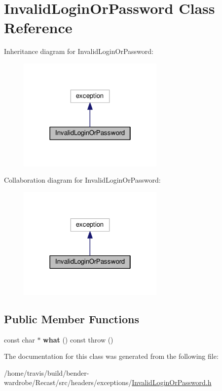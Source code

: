 \hypertarget{class_invalid_login_or_password}{\section{Invalid\-Login\-Or\-Password Class Reference}
\label{class_invalid_login_or_password}
}


Inheritance diagram for Invalid\-Login\-Or\-Password\-:
\nopagebreak
\begin{figure}[H]
\begin{center}
\leavevmode
\includegraphics[width=202pt]{class_invalid_login_or_password__inherit__graph}
\end{center}
\end{figure}


Collaboration diagram for Invalid\-Login\-Or\-Password\-:
\nopagebreak
\begin{figure}[H]
\begin{center}
\leavevmode
\includegraphics[width=202pt]{class_invalid_login_or_password__coll__graph}
\end{center}
\end{figure}
\subsection*{Public Member Functions}
\begin{DoxyCompactItemize}
\item 
\hypertarget{class_invalid_login_or_password_a0bfeb70c42f8cb086eb34e9352e356ec}{const char $\ast$ {\bfseries what} () const   throw ()}\label{class_invalid_login_or_password_a0bfeb70c42f8cb086eb34e9352e356ec}

\end{DoxyCompactItemize}


The documentation for this class was generated from the following file\-:\begin{DoxyCompactItemize}
\item 
/home/travis/build/bender-\/wardrobe/\-Recast/src/headers/exceptions/\hyperlink{_invalid_login_or_password_8h}{Invalid\-Login\-Or\-Password.\-h}\end{DoxyCompactItemize}
